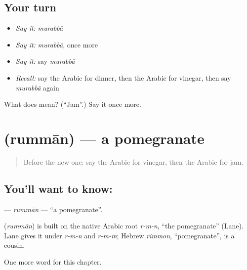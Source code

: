 \subsection*{Your turn}
\begin{itemize}
\raggedright
  \item \emph{Say it:} \emph{murabbā}
  \item \emph{Say it:} \emph{murabbā}, once more
  \item \emph{Say it:} say \emph{murabbā}
  \item \emph{Recall:} say the Arabic for dinner, then the Arabic for vinegar, then say \emph{murabbā} again
\end{itemize}

\begin{tcolorbox}[breakable,colback=teal!4,colframe=teal!35!black,title={Before you move on}]
What does  mean? (\textquotedblleft{}Jam\textquotedblright{}.) Say it once more.
\end{tcolorbox}
\section[\texorpdfstring{\ar{رمان} (rummān)}{رمان (rummān)}]{ (rummān) — a pomegranate}

\label{lesson:AR-C120-rumman}



\begin{quote}
Before the new one: say the Arabic for vinegar, then the Arabic for jam.
\end{quote}

\subsection*{You'll want to know: }
\textbf{} — \emph{rummān} — \textquotedblleft{}a pomegranate\textquotedblright{}.

\begin{cousinweb}
\textbf{} (\emph{rummān}) is built on the native Arabic root \emph{r-m-n}, \textquotedblleft{}the pomegranate\textquotedblright{} (Lane). Lane gives it under \emph{r-m-n} and \emph{r-m-m}; Hebrew \emph{rimmon}, \textquotedblleft{}pomegranate\textquotedblright{}, is a cousin.
\end{cousinweb}

\begin{grammarlens}[title={What you've built}]
One more word for this chapter.
\end{grammarlens}

